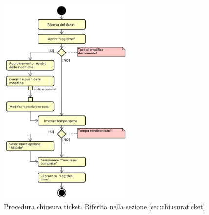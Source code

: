 	        \begin{figure}[h!]
	        	\centering
	        	\includegraphics[width=0.6\textwidth]{img/proc_chiusura_ticket.png}
	        	\caption{Procedura chiusura ticket. Riferita nella sezione \ref{sec:chiusuraticket}}
	        	\label{fig:procChiusuraTicket}
	        \end{figure}\mbox{}\\
